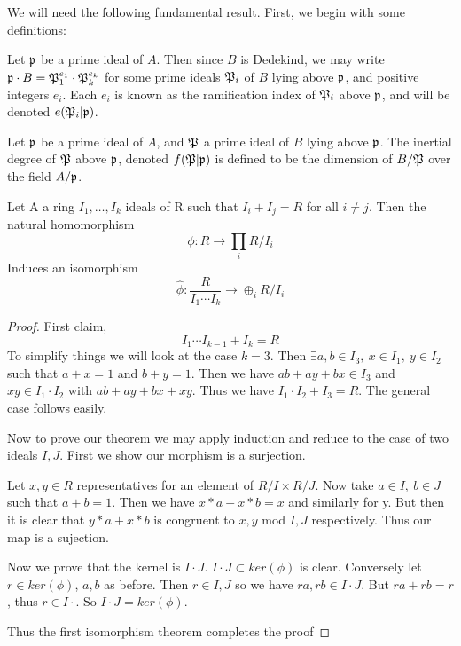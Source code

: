 We will need the following fundamental result. First, we begin with some definitions:

\begin{definition}
  Let $\mathfrak{p}$ be a prime ideal of $A$. 
  Then since $B$ is Dedekind, we may write $\mathfrak{p} \cdot B = \mathfrak{P}_1^{e_1}\cdot\mathfrak{P}_k^{e_k}$ for some prime ideals $\mathfrak{P}_i$ of $B$ lying above $\mathfrak{p}$, and positive integers $e_i$.
  Each $e_i$ is known as the ramification index of $\mathfrak{P}_i$ above $\mathfrak{p}$, and will be denoted $e(\mathfrak{P}_i|\mathfrak{p})$. 
\end{definition}
\begin{definition}
  Let $\mathfrak{p}$ be a prime ideal of $A$, and $\mathfrak{P}$ a prime ideal of $B$ lying above $\mathfrak{p}$.
  The inertial degree of $\mathfrak{P}$ above $\mathfrak{p}$, denoted $f(\mathfrak{P}|\mathfrak{p})$ is defined to be the dimension of $B/\mathfrak{P}$ over the field $A/\mathfrak{p}$.
\end{definition}
\begin{theorem}\label{Chinese Remainder Theorem}
  Let A a ring $I_{1},\ldots,I_{k}$ ideals of R such that $I_i + I_j = R$ for all $i\neq j$.
  Then the natural homomorphism
  \[ \phi:R \rightarrow \prod_i R/I_i \]
  Induces an isomorphism
  \[ \hat{\phi}:\frac{R}{I_1\cdots I_k} \rightarrow \oplus_i R/I_i \]
\end{theorem}
\begin{proof}
  First claim, 
  \[ I_1\cdots I_{k-1} + I_k = R \]
  To simplify things we will look at the case $k=3$.
  Then $\exists a,b \in I_3, \ x \in I_1, \ y \in I_2$ such that $a + x = 1$ and $b + y = 1$.
  Then we have $ab + ay + bx \in I_3$ and $xy \in I_1\cdot I_2$ with $ab + ay + bx + xy$.
  Thus we have $I_1\cdot I_2 + I_3 = R$. The general case follows easily.
  
  Now to prove our theorem we may apply induction and reduce to the case of two ideals $I,J$.
  First we show our morphism is a surjection.

  Let $x,y \in R$ representatives for an element of $R/I \times R/J$.
  Now take $a \in I, \ b \in J$ such that $a + b = 1$.
  Then we have $x*a + x*b = x$ and similarly for y.
  But then it is clear that $y*a + x*b$ is congruent to $x,y$ mod $I,J$ respectively.
  Thus our map is a sujection.

  Now we prove that the kernel is $I\cdot J$.
  $I\cdot J \subset ker(\phi)$ is clear.
  Conversely let $r \in ker(\phi)$, $a,b$ as before.
  Then $r \in I,J$ so we have $ra,rb \in I\cdot J$.
  But $ra + rb = r$, thus $r \in I\cdot$.
  So $I\cdot J = ker(\phi)$.
  
  Thus the first isomorphism theorem completes the proof
\end{proof}
